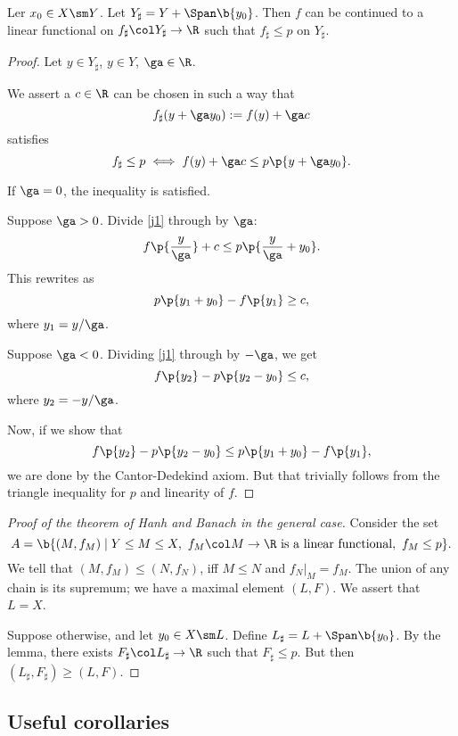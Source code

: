 \begin{lemma}
  Ler $x_0 \in X \sm Y$.
  Let $Y_\sharp = Y + \Span\b{y_0}$.
  Then $f$ can be continued to a linear functional on $f_\sharp  \col Y_\sharp \to \R$ such that $f_\sharp \le p$ on $Y_\sharp$.
\end{lemma}

\begin{proof}
  Let $y \in Y_\sharp$, $y \in Y$, $\ga \in \R$.
  
  We assert a $c \in \R$ can be chosen in such a way that
  $$ f_\sharp(y+\ga y_0) := f(y) + \ga c $$
  satisfies
  \begin{equation}
    \label{j1}
    f_\sharp \le p \iff f(y)+\ga c \le p\p{y+\ga y_0}.
  \end{equation}
  
  If $\ga = 0$, the inequality is satisfied.
  
  Suppose $\ga > 0$.
  Divide \eqref{j1} through by $\ga$:
  $$ f\p{\frac{y}{\ga}} + c \le p\p{\frac{y}{\ga}+y_0}. $$
  This rewrites as
  $$ p\p{y_1+y_0} - f\p{y_1} \ge c, $$
  where $y_1= {y}/{\ga}$.
  
  Suppose $\ga < 0$. Dividing \eqref{j1} through by $-\ga$, we get
  $$ f\p{y_2}-p\p{y_2-y_0} \le c, $$
  where $y_2 = -y/\ga$.
  
  Now, if we show that
  $$ f\p{y_2}-p\p{y_2-y_0} \le p\p{y_1+y_0} - f\p{y_1}, $$
  we are done by the Cantor-Dedekind axiom. But that trivially follows from the triangle inequality for $p$ and linearity of $f$.
\end{proof}

\begin{proof}[Proof of the theorem of Hanh and Banach in the general case]
  Consider the set
  $$ A = \b{(M, f_M) \mid Y \le M \le X,\ f_M \col M \to \R \text{ is a linear functional},\ f_M \le p}. $$
  We tell that $(M, f_M) \le (N, f_N)$, iff $M \le N$ and $f_N|_M = f_M$.
  The union of any chain is its supremum; we have a maximal element $(L, F)$.
  We assert that $L = X$.
  
  Suppose otherwise, and let $y_0 \in X \sm L$.
  Define $L_\sharp = L + \Span\b{y_0}$.
  By the lemma, there exists $F_\sharp \col L_\sharp \to \R$ such that $F_\sharp \le p.$
  But then $(L_\sharp, F_\sharp) \ge (L, F)$. 
\end{proof}

\newcommand{\cB}[0]{\mc{B}}

\subsection{Useful corollaries}

